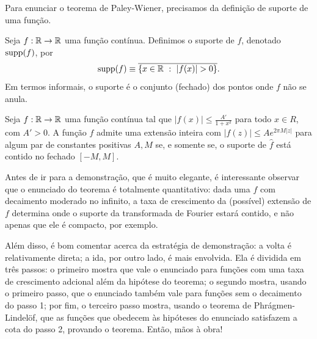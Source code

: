         Para enunciar o teorema de Paley-Wiener, precisamos da definição de suporte de uma função.
        \begin{definicao}
        \label{def-suporte}
            Seja $f:\mathbb{R}\to\mathbb{R}$ uma função contínua. Definimos o suporte de $f$, denotado $\operatorname{supp}(f)$, por
            \begin{equation*}
                \operatorname{supp}(f) \equiv \overline{\{ x\in\mathbb{R} \ : \ |f(x)| > 0 \}}.
            \end{equation*}
            Em termos informais, o suporte é o conjunto (fechado) dos pontos onde $f$ não se anula.
        \end{definicao}
        \begin{teorema}
        \label{teo-paley-wiener}
            Seja $f:\mathbb{R}\to\mathbb{R}$ uma função contínua tal que $\displaystyle{ |f(x)| \leq \frac{A'}{1+x^2} }$
            para todo $x\in R$, com $A'>0$. A função $f$ admite uma extensão inteira com
            $|f(z)| \leq Ae^{2\pi M|z|}$ para algum par de constantes positivas $A,M$ se, e somente se,
            o suporte de $\widehat{f}$ está contido no fechado $[-M,M]$.
        \end{teorema}
        Antes de ir para a demonstração, que é muito elegante, é interessante observar que o enunciado
        do teorema é totalmente quantitativo: dada uma $f$ com decaimento moderado no infinito, 
        a taxa de crescimento da (possível) extensão de $f$ determina onde
        o suporte da transformada de Fourier estará contido, e não apenas que ele é compacto, por exemplo.
        
        Além disso, é bom comentar acerca da estratégia de demonstração: a volta é relativamente direta;
        a ida, por outro lado, é mais envolvida. Ela é dividida em três passos: o primeiro mostra que
        vale o enunciado para funções com uma taxa de crescimento adcional
        além da hipótese do teorema; o
        segundo mostra, usando o primeiro passo, que o enunciado também vale para funções sem o 
        decaimento do passo 1;
        por fim, o terceiro passo mostra, usando o teorema de Phrágmen-Lindelöf, que as funções
        que obedecem às hipóteses do enunciado satisfazem a cota 
        do passo 2, 
        provando o teorema. Então, mãos à obra!
        

